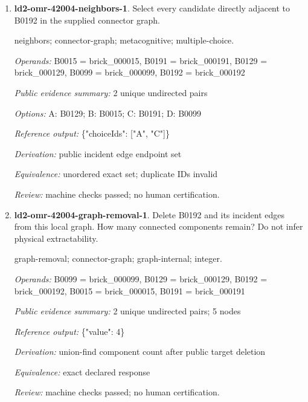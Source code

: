 \begin{enumerate}
\par{\small interface; connector-graph; metacognitive; single-choice.\par\textit{Operands:} B0146 = brick\_000146, B0145 = brick\_000145\par\textit{Public evidence summary:} \{"connectorRecord": \{"family": "stud", "aConnector": 1, "bConnector": 5\}, "scope": "Upstream connector tolerances and inset mesh intersections; unknown parts remain explicit, separate scene objects are not glued together; no load/force validation."\}\par\textit{Options:} A: fixed; B: stud; C: axle; D: hinge; E: ball\par\textit{Reference output:} \{"choiceId": "B"\}\par\textit{Derivation:} public connectorRecord.family equality\par\textit{Equivalence:} exact declared response\par\textit{Review:} machine checks passed; no human certification.}
\item \textbf{ld2-omr-42004-neighbors-1}. Select every candidate directly adjacent to B0192 in the supplied connector graph.
\par{\small neighbors; connector-graph; metacognitive; multiple-choice.\par\textit{Operands:} B0015 = brick\_000015, B0191 = brick\_000191, B0129 = brick\_000129, B0099 = brick\_000099, B0192 = brick\_000192\par\textit{Public evidence summary:} 2 unique undirected pairs\par\textit{Options:} A: B0129; B: B0015; C: B0191; D: B0099\par\textit{Reference output:} \{"choiceIds": ["A", "C"]\}\par\textit{Derivation:} public incident edge endpoint set\par\textit{Equivalence:} unordered exact set; duplicate IDs invalid\par\textit{Review:} machine checks passed; no human certification.}
\item \textbf{ld2-omr-42004-graph-removal-1}. Delete B0192 and its incident edges from this local graph. How many connected components remain? Do not infer physical extractability.
\par{\small graph-removal; connector-graph; graph-internal; integer.\par\textit{Operands:} B0099 = brick\_000099, B0129 = brick\_000129, B0192 = brick\_000192, B0015 = brick\_000015, B0191 = brick\_000191\par\textit{Public evidence summary:} 2 unique undirected pairs; 5 nodes\par\textit{Reference output:} \{"value": 4\}\par\textit{Derivation:} union-find component count after public target deletion\par\textit{Equivalence:} exact declared response\par\textit{Review:} machine checks passed; no human certification.}

\end{enumerate}
